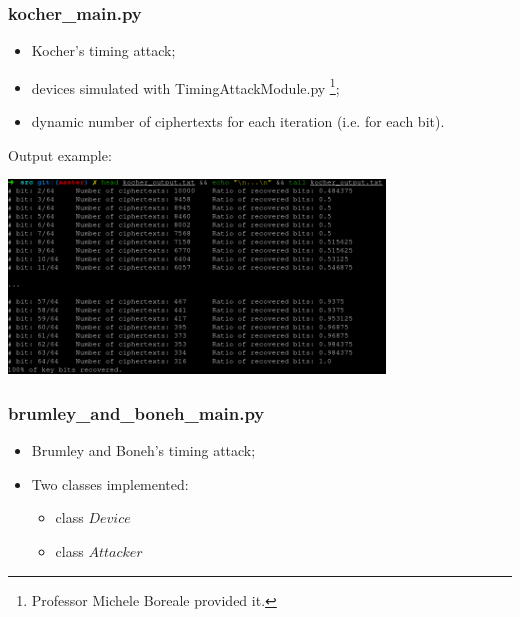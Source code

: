 \documentclass{beamer}
\begin{document}
\begin{frame}
\frametitle{kocher\_main.py}

\begin{itemize}
  \item Kocher's timing attack;
  \item devices simulated with TimingAttackModule.py \footnote{Professor Michele Boreale provided it.};
  \item dynamic number of ciphertexts for each iteration (i.e. for each bit).
\end{itemize}

Output example:

{
  \center
  \includegraphics[width=0.75\textwidth]{figures/kocher_output_example}
}

\end{frame}
\begin{frame}
\frametitle{brumley\_and\_boneh\_main.py}

\begin{itemize}
  \item Brumley and Boneh's timing attack;
  \item Two classes implemented:
  \begin{itemize}
    \item class $Device$
    \item class $Attacker$
  \end{itemize}
\end{itemize}

\end{frame}
\end{document}

